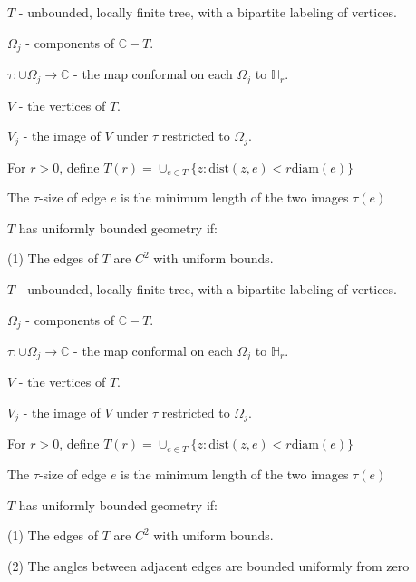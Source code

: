 \documentclass{beamer}
\begin{document}
\begin{frame}

$T$ - unbounded, locally finite tree, with a bipartite labeling of vertices.

$\Omega_j$ - components of $\mathbb{C}-T$.

$\tau: \cup \Omega_j \rightarrow \mathbb{C}$ - the map conformal on each $\Omega_j$ to $\mathbb{H}_r$.

$V$ - the vertices of $T$. 

$V_j$ - the image of $V$ under $\tau$ restricted to $\Omega_j$.

For $r > 0$, define $T(r) = \cup_{e\in T} \{z : \textrm{dist}(z,e) < r\textrm{diam}(e) \}$

The $\tau$-size of edge $e$ is the minimum length of the two images $\tau(e)$

\vspace{5mm}

$T$ has uniformly bounded geometry if: 

\hspace{5mm} (1) The edges of $T$ are $C^2$ with uniform bounds. 

\end{frame}





\begin{frame}

$T$ - unbounded, locally finite tree, with a bipartite labeling of vertices.

$\Omega_j$ - components of $\mathbb{C}-T$.

$\tau: \cup \Omega_j \rightarrow \mathbb{C}$ - the map conformal on each $\Omega_j$ to $\mathbb{H}_r$.

$V$ - the vertices of $T$. 

$V_j$ - the image of $V$ under $\tau$ restricted to $\Omega_j$.

For $r > 0$, define $T(r) = \cup_{e\in T} \{z : \textrm{dist}(z,e) < r\textrm{diam}(e) \}$

The $\tau$-size of edge $e$ is the minimum length of the two images $\tau(e)$

\vspace{5mm}

$T$ has uniformly bounded geometry if: 

\hspace{5mm} (1) The edges of $T$ are $C^2$ with uniform bounds. 

\hspace{5mm} (2) The angles between adjacent edges are bounded uniformly from zero

\end{frame}
\end{document}
